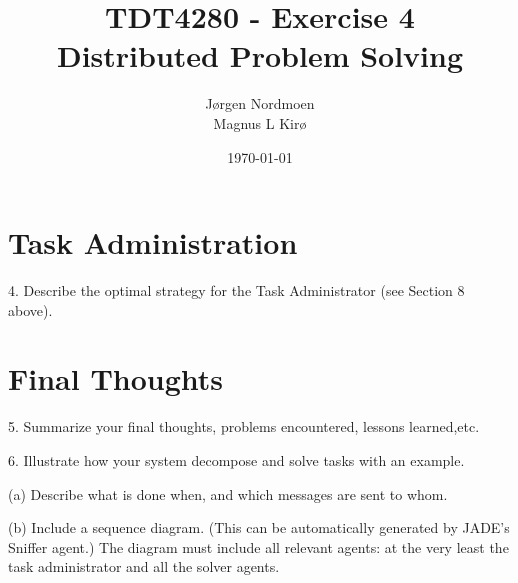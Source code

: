\documentclass[12pt, a4paper]{article}
\title{
TDT4280 - Exercise 4 \\
Distributed Problem Solving
}
\author{
	Jørgen Nordmoen \\
        Magnus L Kirø \\
}
\date{\today}
\begin{document}
\maketitle
{}







\section{Task Administration}
4. Describe the optimal strategy for the Task Administrator (see Section 8 above).

\section{Final Thoughts}
5. Summarize your final thoughts, problems encountered, lessons learned,etc.

6. Illustrate how your system decompose and solve tasks with an example.

(a) Describe what is done when, and which messages are sent to whom.

(b) Include a sequence diagram. (This can be automatically generated by JADE's
Sniffer agent.) 
The diagram must include all relevant agents: at the very least the task administrator and all the solver agents.


\end{document}
